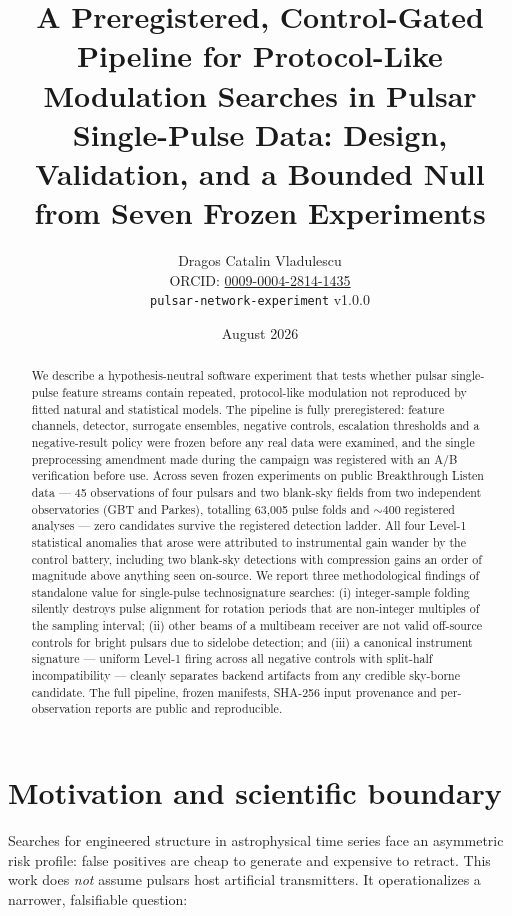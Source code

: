 \documentclass[11pt]{article}
\title{A Preregistered, Control-Gated Pipeline for Protocol-Like Modulation
Searches in Pulsar Single-Pulse Data: Design, Validation, and a Bounded Null
from Seven Frozen Experiments}
\author{Dragos Catalin Vladulescu\\
\small ORCID: \href{https://orcid.org/0009-0004-2814-1435}{0009-0004-2814-1435}\\
\small \texttt{pulsar-network-experiment} v1.0.0}
\date{August 2026}
\begin{document}
\maketitle

\begin{abstract}
We describe a hypothesis-neutral software experiment that tests whether pulsar
single-pulse feature streams contain repeated, protocol-like modulation not
reproduced by fitted natural and statistical models. The pipeline is fully
preregistered: feature channels, detector, surrogate ensembles, negative
controls, escalation thresholds and a negative-result policy were frozen before
any real data were examined, and the single preprocessing amendment made during
the campaign was registered with an A/B verification before use. Across seven
frozen experiments on public Breakthrough Listen data --- 45 observations of
four pulsars and two blank-sky fields from two independent observatories (GBT
and Parkes), totalling 63{,}005 pulse folds and ${\sim}400$ registered analyses
--- zero candidates survive the registered detection ladder. All four Level-1
statistical anomalies that arose were attributed to instrumental gain wander by
the control battery, including two blank-sky detections with compression gains
an order of magnitude above anything seen on-source. We report three
methodological findings of standalone value for single-pulse technosignature
searches: (i) integer-sample folding silently destroys pulse alignment for
rotation periods that are non-integer multiples of the sampling interval;
(ii) other beams of a multibeam receiver are not valid off-source controls for
bright pulsars due to sidelobe detection; and (iii) a canonical instrument
signature --- uniform Level-1 firing across all negative controls with
split-half incompatibility --- cleanly separates backend artifacts from any
credible sky-borne candidate. The full pipeline, frozen manifests, SHA-256
input provenance and per-observation reports are public and reproducible.
\end{abstract}

\section{Motivation and scientific boundary}

Searches for engineered structure in astrophysical time series face an
asymmetric risk profile: false positives are cheap to generate and expensive to
retract. This work does \emph{not} assume pulsars host artificial
transmitters. It operationalizes a narrower, falsifiable question:
\end{document}
